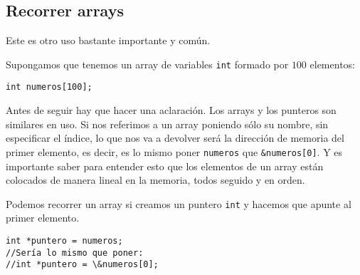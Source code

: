 \documentclass{hxc_cl}
\begin{document}
\subsection{Recorrer arrays}

Este es otro uso bastante importante y común.

Supongamos que tenemos un array de variables \texttt{int} formado por $100$ elementos:

\begin{lstlisting}
int numeros[100];
\end{lstlisting}

Antes de seguir hay que hacer una aclaración. Los arrays y los punteros son similares en uso. Si nos referimos a un array poniendo sólo su nombre, sin especificar el índice, lo que nos va a devolver será la dirección de memoria del primer elemento, es decir, es lo mismo poner \texttt{numeros} que \texttt{\&numeros[0]}. Y es importante saber para entender esto que los elementos de un array están colocados de manera lineal en la memoria, todos seguido y en orden.

Podemos recorrer un array si creamos un puntero \texttt{int} y hacemos que apunte al primer elemento.

\begin{lstlisting}
int *puntero = numeros;
//Sería lo mismo que poner:
//int *puntero = \&numeros[0];
\end{lstlisting}
\end{document}
